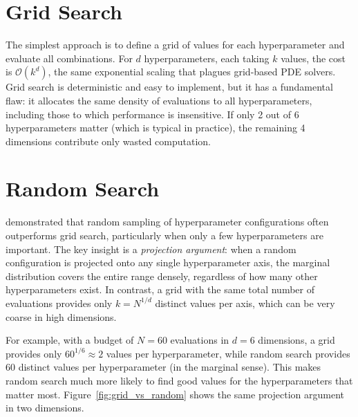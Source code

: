 \documentclass[11pt,a4paper]{report}
\begin{document}
\section{Grid Search}

The simplest approach is to define a grid of values for each hyperparameter and evaluate all combinations.  For $d$ hyperparameters, each taking $k$ values, the cost is $\mathcal{O}(k^d)$, the same exponential scaling that plagues grid-based PDE solvers.  Grid search is deterministic and easy to implement, but it has a fundamental flaw: it allocates the same density of evaluations to all hyperparameters, including those to which performance is insensitive.  If only 2 out of 6 hyperparameters matter (which is typical in practice), the remaining 4 dimensions contribute only wasted computation.

\section{Random Search}

\citet{bergstra2012random} demonstrated that random sampling of hyperparameter configurations often outperforms grid search, particularly when only a few hyperparameters are important.  The key insight is a \emph{projection argument}: when a random configuration is projected onto any single hyperparameter axis, the marginal distribution covers the entire range densely, regardless of how many other hyperparameters exist.  In contrast, a grid with the same total number of evaluations provides only $k = N^{1/d}$ distinct values per axis, which can be very coarse in high dimensions.

For example, with a budget of $N = 60$ evaluations in $d = 6$ dimensions, a grid provides only $60^{1/6} \approx 2$ values per hyperparameter, while random search provides 60 distinct values per hyperparameter (in the marginal sense).  This makes random search much more likely to find good values for the hyperparameters that matter most.  Figure~\ref{fig:grid_vs_random} shows the same projection argument in two dimensions.
\end{document}
